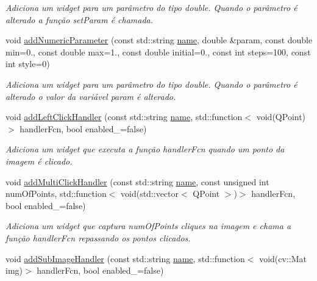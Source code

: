 \begin{DoxyCompactItemize}
\begin{DoxyCompactList}\small\item\em Adiciona um widget para um parâmetro do tipo double. Quando o parâmetro é alterado a função set\+Param é chamada. \end{DoxyCompactList}\item 
\hypertarget{class_process_control_a728585b52151f34fb52cffdef25a53ae}{}void \hyperlink{class_process_control_a728585b52151f34fb52cffdef25a53ae}{add\+Numeric\+Parameter} (const std\+::string \hyperlink{class_process_control_abc29e461e01cc0c712944f8f47f91331}{name}, double \&param, const double min=0., const double max=1., const double initial=0., const int steps=100, const int style=0)\label{class_process_control_a728585b52151f34fb52cffdef25a53ae}

\begin{DoxyCompactList}\small\item\em Adiciona um widget para um parâmetro do tipo double. Quando o parâmetro é alterado o valor da variável param é alterado. \end{DoxyCompactList}\item 
\hypertarget{class_process_control_a3d13872e46159846955f51ad4b651135}{}void \hyperlink{class_process_control_a3d13872e46159846955f51ad4b651135}{add\+Left\+Click\+Handler} (const std\+::string \hyperlink{class_process_control_abc29e461e01cc0c712944f8f47f91331}{name}, std\+::function$<$ void(Q\+Point)$>$ handler\+Fcn, bool enabled\+\_\+=false)\label{class_process_control_a3d13872e46159846955f51ad4b651135}

\begin{DoxyCompactList}\small\item\em Adiciona um widget que executa a função handler\+Fcn quando um ponto da imagem é clicado. \end{DoxyCompactList}\item 
\hypertarget{class_process_control_a7d15eb536761436d80d42b2959fb989e}{}void \hyperlink{class_process_control_a7d15eb536761436d80d42b2959fb989e}{add\+Multi\+Click\+Handler} (const std\+::string \hyperlink{class_process_control_abc29e461e01cc0c712944f8f47f91331}{name}, const unsigned int num\+Of\+Points, std\+::function$<$ void(std\+::vector$<$ Q\+Point $>$)$>$ handler\+Fcn, bool enabled\+\_\+=false)\label{class_process_control_a7d15eb536761436d80d42b2959fb989e}

\begin{DoxyCompactList}\small\item\em Adiciona um widget que captura num\+Of\+Points cliques na imagem e chama a função handler\+Fcn repassando os pontos clicados. \end{DoxyCompactList}\item 
\hypertarget{class_process_control_a4a0b533407f26dbe53130d931afb645d}{}void \hyperlink{class_process_control_a4a0b533407f26dbe53130d931afb645d}{add\+Sub\+Image\+Handler} (const std\+::string \hyperlink{class_process_control_abc29e461e01cc0c712944f8f47f91331}{name}, std\+::function$<$ void(cv\+::\+Mat img)$>$ handler\+Fcn, bool enabled\+\_\+=false)\label{class_process_control_a4a0b533407f26dbe53130d931afb645d}


\end{DoxyCompactItemize}
